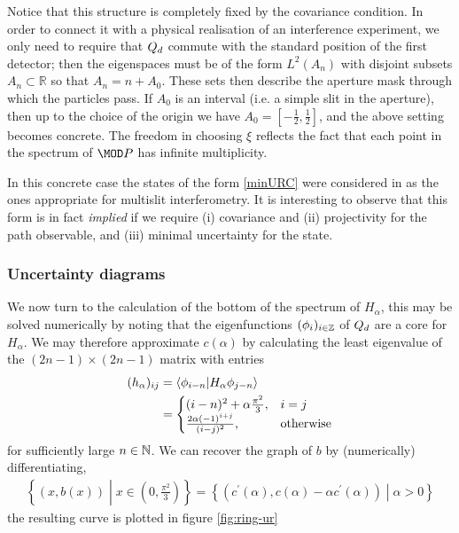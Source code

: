 Notice that this structure is completely fixed by the covariance condition. In order to connect it with a physical realisation of an interference experiment, we only need to require that $Q_d$ commute with the standard position of the first detector; then the eigenspaces must be of the form $L^2(A_n)$ with disjoint subsets $A_n\subset \mathbb R$ so that $A_n = n+ A_0$. These sets then describe the aperture mask through which the particles pass. If $A_0$ is an interval (i.e. a simple slit in the aperture), then up to the choice of the origin we have $A_0=[-\frac 12,\frac 12]$, and the above setting becomes concrete. The freedom in choosing $\xi$ reflects the fact that each point in the spectrum of $\MOD P$ has infinite multiplicity. 

In this concrete case the states of the form \eqref{minURC} were considered in \cite{} as the ones appropriate for multislit interferometry. It is interesting to observe that this form is in fact \emph{implied} if we require (i) covariance and (ii) projectivity for the path observable, and (iii) minimal uncertainty for the state.

\subsubsection{Uncertainty diagrams}
We now turn to the calculation of the bottom of the spectrum of $H_\alpha$, this may be solved numerically by noting that the eigenfunctions $(\phi_i)_{i\in\mathbb{Z}}$ of $Q_d$ are a core for $H_\alpha$. We may therefore approximate $c(\alpha)$ by calculating the least eigenvalue of the $(2n-1)\times (2n-1)$ matrix with entries
\begin{align}
  (h_\alpha)_{ij} &= \langle \phi_{i-n}|H_\alpha \phi_{j-n}\rangle\\
                  &= \begin{cases}(i-n)^2 + \alpha\frac{\pi^2}{3},& i = j\\ \frac{2 \alpha(-1)^{i+j}}{(i-j)^2}, & \text{otherwise}\end{cases}
\end{align}
for sufficiently large $n\in\mathbb{N}$. We can recover the graph of $b$ by (numerically) differentiating, 
\begin{align}
  \left\{(x,b(x))\middle|x\in \left(0,\frac{\pi^2}{3}\right)\right\} = \left\{ (c^\prime(\alpha), c(\alpha)-\alpha c^\prime(\alpha))\middle| \alpha > 0\right\}
\end{align}
the resulting curve is plotted in figure \ref{fig:ring-ur}


